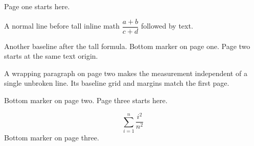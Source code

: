 \documentclass[12pt,letterpaper]{article}
\begin{document}
Page one starts here.\par
A normal line before tall inline math $\dfrac{a+b}{c+d}$ followed by text.\par
Another baseline after the tall formula.
\vfill
Bottom marker on page one.
\newpage
Page two starts at the same text origin.\par
\begin{minipage}{240pt}
A wrapping paragraph on page two makes the measurement independent of a single unbroken line. Its baseline grid and margins match the first page.
\end{minipage}
\vfill
Bottom marker on page two.
\newpage
Page three starts here.\par
\[ \sum_{i=1}^{n} \frac{i^2}{n^2} \]
\vfill
Bottom marker on page three.
\end{document}

